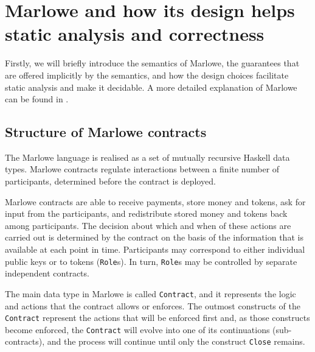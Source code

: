 \documentclass[english,runningheads]{llncs}
\begin{document}
\section{Marlowe and how its design helps static analysis and correctness\label{sec:Marlowe-intro} }

Firstly, we will briefly introduce the semantics of Marlowe, the guarantees
that are offered implicitly by the semantics, and how the design choices
facilitate static analysis and make it decidable. A more detailed
explanation of Marlowe can be found in \cite{marlowe}.

\subsection{Structure of Marlowe contracts\label{subsec:Structure-of-Marlowe} }

The Marlowe language is realised as a set of mutually recursive Haskell
data types. Marlowe contracts regulate interactions between a finite number
of participants, determined before the contract is deployed.

Marlowe contracts are able to receive payments, store money and tokens,
ask for input from the participants, and redistribute stored money
and tokens back among participants. The decision about which and when of
these actions are carried out is determined by the contract on the basis
of the information that is available at each point in time. Participants
may correspond to either individual public keys or to tokens (\texttt{Role}s).
In turn, \texttt{Role}s may be controlled by separate independent contracts.

The main data type in Marlowe is called \texttt{Contract}, and it represents
the logic and actions that the contract allows or enforces. The outmost
constructs of the \texttt{Contract} represent the actions that will be enforced
first and, as those constructs become enforced, the \texttt{Contract} will
evolve into one of its continuations (sub-contracts), and the process
will continue until only the construct \texttt{Close} remains.
\end{document}
